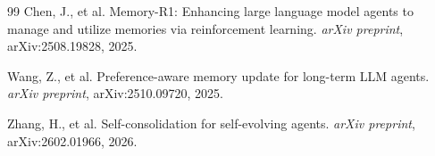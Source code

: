 \documentclass[11pt,a4paper]{article}
\begin{document}
\begin{thebibliography}{99}
Chen, J., et al.
\newblock Memory-R1: Enhancing large language model agents to manage and
  utilize memories via reinforcement learning.
\newblock \textit{arXiv preprint}, arXiv:2508.19828, 2025.

Wang, Z., et al.
\newblock Preference-aware memory update for long-term LLM agents.
\newblock \textit{arXiv preprint}, arXiv:2510.09720, 2025.

Zhang, H., et al.
\newblock Self-consolidation for self-evolving agents.
\newblock \textit{arXiv preprint}, arXiv:2602.01966, 2026.

\end{thebibliography}
\end{document}
